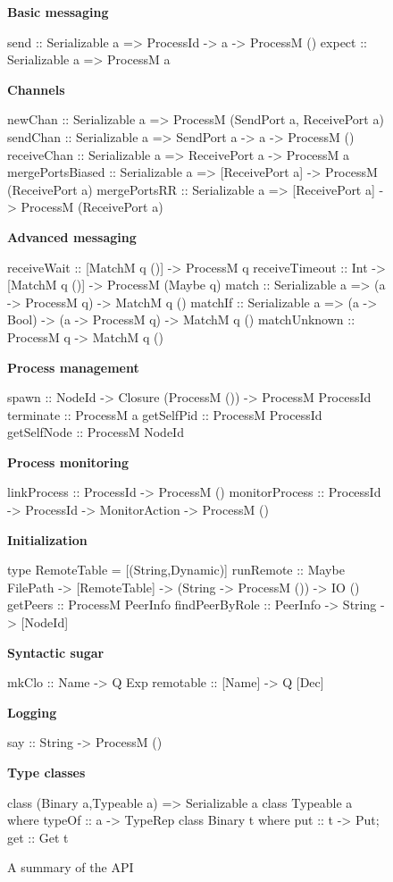 \documentclass[preprint]{sigplanconf}
\begin{document}
\begin{figure}[t!]
\small
\textbf{Basic messaging} 
\begin{code}
send   :: Serializable a => ProcessId -> a
       -> ProcessM ()
expect :: Serializable a => ProcessM a
\end{code}
 \textbf{Channels}
\begin{code}
newChan  :: Serializable a 
         => ProcessM (SendPort a, ReceivePort a)
sendChan :: Serializable a 
         => SendPort a -> a -> ProcessM ()
receiveChan :: Serializable a => ReceivePort a
            -> ProcessM a
mergePortsBiased :: Serializable a => [ReceivePort a]
                 -> ProcessM (ReceivePort a)
mergePortsRR :: Serializable a => [ReceivePort a] 
             -> ProcessM (ReceivePort a)
\end{code}

 \textbf{Advanced messaging}
\begin{code}
receiveWait    :: [MatchM q ()] -> ProcessM q
receiveTimeout :: Int -> [MatchM q ()] 
               -> ProcessM (Maybe q)
match   :: Serializable a => (a -> ProcessM q) 
        -> MatchM q ()
matchIf :: Serializable a => (a -> Bool) 
        -> (a -> ProcessM q) -> MatchM q ()
matchUnknown :: ProcessM q -> MatchM q ()
\end{code}

 \textbf{Process management}
\begin{code}
spawn :: NodeId -> Closure (ProcessM ()) 
      -> ProcessM ProcessId
terminate :: ProcessM a
getSelfPid :: ProcessM ProcessId
getSelfNode :: ProcessM NodeId
\end{code}

 \textbf{Process monitoring}
\begin{code}
linkProcess :: ProcessId -> ProcessM ()
monitorProcess :: ProcessId -> ProcessId 
               -> MonitorAction -> ProcessM ()
\end{code}

 \textbf{Initialization}
\begin{code}
type RemoteTable = [(String,Dynamic)]
runRemote      :: Maybe FilePath -> [RemoteTable] 
               -> (String -> ProcessM ()) -> IO ()
getPeers       :: ProcessM PeerInfo
findPeerByRole :: PeerInfo -> String -> [NodeId]
\end{code}

 \textbf{Syntactic sugar}
\begin{code}
mkClo     :: Name   -> Q Exp
remotable :: [Name] -> Q [Dec]
\end{code}

 \textbf{Logging}
\begin{code}
say :: String -> ProcessM ()
\end{code}

 \textbf{Type classes}
\begin{code}
class (Binary a,Typeable a) => Serializable a
class Typeable a where typeOf :: a -> TypeRep
class Binary t where put :: t -> Put; get :: Get t
\end{code}
\caption{A summary of the API} \label{fig:api}
\end{figure}
\end{document}
